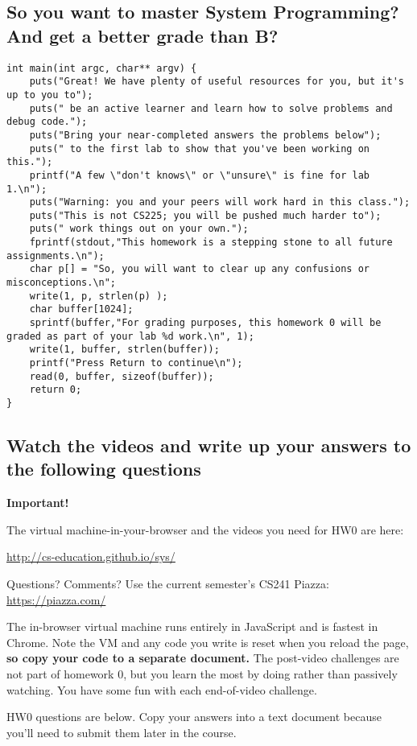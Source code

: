 \subsection{So you want to master System Programming? And get a better grade than B?}

\begin{verbatim}
int main(int argc, char** argv) {
	puts("Great! We have plenty of useful resources for you, but it's up to you to");
	puts(" be an active learner and learn how to solve problems and debug code.");
	puts("Bring your near-completed answers the problems below");
	puts(" to the first lab to show that you've been working on this.");
	printf("A few \"don't knows\" or \"unsure\" is fine for lab 1.\n");
	puts("Warning: you and your peers will work hard in this class.");
	puts("This is not CS225; you will be pushed much harder to");
	puts(" work things out on your own.");
	fprintf(stdout,"This homework is a stepping stone to all future assignments.\n");
	char p[] = "So, you will want to clear up any confusions or misconceptions.\n";
	write(1, p, strlen(p) );
	char buffer[1024];
	sprintf(buffer,"For grading purposes, this homework 0 will be graded as part of your lab %d work.\n", 1);
	write(1, buffer, strlen(buffer));
	printf("Press Return to continue\n");
	read(0, buffer, sizeof(buffer));
	return 0;
}
\end{verbatim}

\subsection{Watch the videos and write up your answers to the following questions}

\textbf{Important!}

The virtual machine-in-your-browser and the videos you need for HW0 are here:

\url{http://cs-education.github.io/sys/}

Questions? Comments? Use the current semester's CS241 Piazza:
\url{https://piazza.com/}

The in-browser virtual machine runs entirely in JavaScript and is fastest in Chrome.
Note the VM and any code you write is reset when you reload the page, \textbf{so copy your code to a separate document.}
The post-video challenges are not part of homework 0, but you learn the most by doing rather than passively watching.
You have some fun with each end-of-video challenge.

HW0 questions are below. Copy your answers into a text document because you'll need to submit them later in the course.

